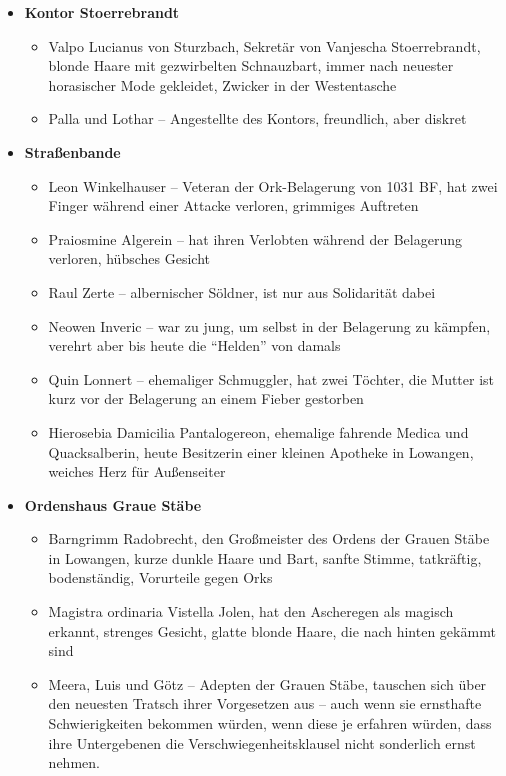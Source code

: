 \begin{itemize}
    \item \textbf{Kontor Stoerrebrandt}
        \begin{itemize}
        	\item  Valpo Lucianus von Sturzbach, Sekretär von Vanjescha Stoerrebrandt, blonde Haare mit gezwirbelten Schnauzbart, immer nach neuester horasischer Mode gekleidet, Zwicker in der Westentasche
        \item Palla und Lothar -- Angestellte des Kontors, freundlich, aber diskret
                \end{itemize}
    \item \textbf{Straßenbande}
                \begin{itemize}
        	\item  Leon Winkelhauser -- Veteran der Ork-Belagerung von 1031 BF, hat zwei Finger während einer Attacke verloren, grimmiges Auftreten
        \item Praiosmine Algerein -- hat ihren Verlobten während der Belagerung verloren, hübsches Gesicht
        \item Raul Zerte -- albernischer Söldner, ist nur aus Solidarität dabei
        \item Neowen Inveric -- war zu jung, um selbst in der Belagerung zu kämpfen, verehrt aber bis heute die \enquote{Helden} von damals
    \item Quin Lonnert -- ehemaliger Schmuggler, hat zwei Töchter, die Mutter ist kurz vor der Belagerung an einem Fieber gestorben
    \item Hierosebia Damicilia Pantalogereon, ehemalige fahrende Medica und Quacksalberin, heute Besitzerin einer kleinen Apotheke in Lowangen, weiches Herz für Außenseiter
    \end{itemize}
    \item \textbf{Ordenshaus Graue Stäbe}
                \begin{itemize}
        	\item  Barngrimm Radobrecht, den Großmeister des Ordens der Grauen Stäbe in Lowangen, kurze dunkle Haare und Bart, sanfte Stimme, tatkräftig, bodenständig, Vorurteile gegen Orks
      \item  Magistra ordinaria Vistella Jolen, hat den Ascheregen als magisch erkannt, strenges Gesicht, glatte blonde Haare, die nach hinten gekämmt sind
        \item Meera, Luis und Götz -- Adepten der Grauen Stäbe, tauschen sich über den neuesten Tratsch ihrer Vorgesetzen aus -- auch wenn sie ernsthafte Schwierigkeiten bekommen würden, wenn diese je erfahren würden, dass ihre Untergebenen die Verschwiegenheitsklausel nicht sonderlich ernst nehmen.
        \end{itemize}
        \end{itemize}

